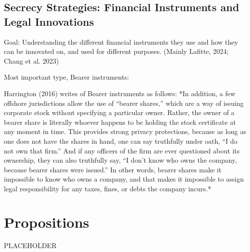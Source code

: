 \subsection{Secrecy Strategies: Financial Instruments and Legal Innovations}
\label{subsec:2_1_5}

Goal: Understanding the different financial instruments they use and how they can be innovated on, and used for different purposes. (Mainly Lafitte, 2024; Chang et al. 2023)


Most important type, Bearer instruments:

Harrington (2016) writes of Bearer instruments as follows:
*In addition, a few offshore jurisdictions allow the use of “bearer shares,” which are a way of issuing corporate stock without specifying a particular owner. Rather, the owner of a bearer share is literally whoever happens to be holding the stock certificate at any moment in time. This provides strong privacy protections, because as long as one does not have the shares in hand, one can say truthfully under oath, “I do not own that firm.” And if any officers of the firm are ever questioned about its ownership, they can also truthfully say, “I don’t know who owns the company, because bearer shares were issued.” In other words, bearer shares make it impossible to know who owns a company, and that makes it impossible to assign legal responsibility for any taxes, fines, or debts the company incurs.*


\section{Propositions}
\label{sec:2_2}

PLACEHOLDER





